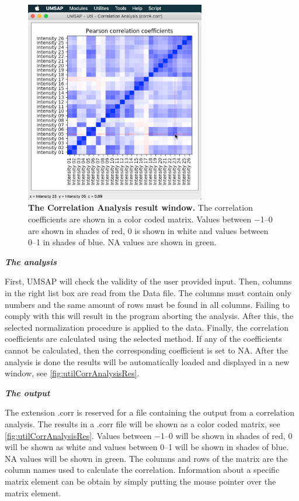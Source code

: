 \begin{figure}[h]
	\centering
	\includegraphics[width=0.7\textwidth]{./IMAGES/UTIL-CORR-WINDOW/util-corr-res.jpg}	    
	\caption[The Correlation Analysis result window]{\textbf{The Correlation Analysis result window.} The correlation coefficients are shown in a color coded matrix. Values between \numrange{-1}{0} are shown in shades of red, \num{0} is shown in white and values between \numrange{0}{1} in shades of blue. NA values are shown in green.}
	\label{fig:utilCorrAnalysisRes}
	\vspace{-5pt} 	
\end{figure} 

\textit{\textbf{The analysis}}

First, UMSAP will check the validity of the user provided input. Then, columns in the right list box are read from the Data file. The columns must contain only numbers and the same amount of rows must be found in all columns. Failing to comply with this will result in the program aborting the analysis. After this, the selected normalization procedure is applied to the data. Finally, the correlation coefficients are calculated using the selected method. If any of the coefficients cannot be calculated, then the corresponding coefficient is set to NA. After the analysis is done the results will be automatically loaded and displayed in a new window, see \autoref{fig:utilCorrAnalysisRes}. 

\textit{\textbf{The output}}

The extension .corr is reserved for a file containing the output from a correlation analysis. The results in a .corr file will be shown as a color coded matrix, see \autoref{fig:utilCorrAnalysisRes}. Values between \numrange{-1}{0} will be shown in shades of red, \num{0} will be shown as white and values between \numrange{0}{1} will be shown in shades of blue. NA values will be shown in green. The columns and rows of the matrix are the column names used to calculate the correlation. Information about a specific matrix element can be obtain by simply putting the mouse pointer over the matrix element.  


